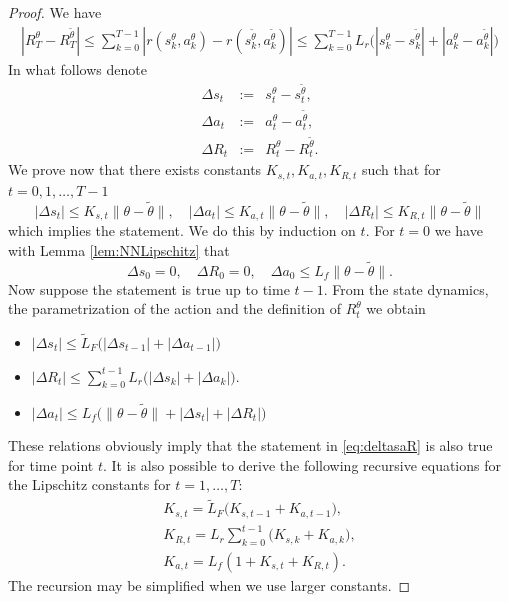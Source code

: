 \documentclass[reqno, 11pt]{amsart}%
\theoremstyle{definition}
\begin{document}
\begin{proof}    
We have
\begin{eqnarray*}
| R_T^\theta - R_T^{\tilde\theta}| \le \sum_{k=0}^{T-1} | r(s_k^\theta,a_k^\theta) - r(s_k^{\tilde\theta},a_k^{\tilde\theta})| \le \sum_{k=0}^{T-1} L_{r} \big( | s_k^\theta- s_k^{\tilde\theta}| +|a_k^\theta -a_k^{\tilde\theta}| \big)
\end{eqnarray*}
In what follows denote
\begin{eqnarray*}
\Delta s_t &:=& s_t^\theta- s_t^{\tilde\theta},\\
\Delta a_t &:=& a_t^\theta- a_t^{\tilde\theta},\\
\Delta R_t &:=& R_t^\theta- R_t^{\tilde\theta}.
\end{eqnarray*}
We prove now that there exists constants $K_{s,t}, K_{a,t}, K_{R,t}$ such that for $t=0,1,\ldots ,T-1$
\begin{equation}\label{eq:deltasaR} | \Delta s_t| \le K_{s,t} \|\theta-\tilde\theta\|,\quad | \Delta a_t| \le K_{a,t}\|\theta-\tilde\theta\|, \quad | \Delta R_t| \le K_{R,t}\|\theta-\tilde\theta\|
\end{equation}
which implies the statement.
We do this by induction on $t$. For $t=0$ we have with Lemma \ref{lem:NNLipschitz} that
$$ \Delta s_0=0, \quad \Delta R_0 =0, \quad \Delta a_0\le L_{f} \|\theta-\tilde\theta\|. $$
Now suppose the statement is true up to time $t-1$.
From the state dynamics, the parametrization of the action and the definition of $R_t^\theta$ we obtain
\begin{itemize}
\item[(1)] $| \Delta s_t| \le \tilde L_{F} \big( |\Delta s_{t-1}|+  |\Delta a_{t-1}|\big)$
\item[(2)] $| \Delta R_t| \le \sum_{k=0}^{t-1}  L_{r} \big( | \Delta s_k| + | \Delta a_k| \big)$.
\item[(3)] $| \Delta a_t| \le L_{f} \big( \|\theta-\tilde\theta\| + |\Delta s_{t}|+ |\Delta R_{t}|\big)$
\end{itemize}
These relations obviously imply that the statement in \eqref{eq:deltasaR} is also true for time point $t$. It is also possible to derive the following recursive equations for the Lipschitz constants for $t=1,\ldots, T$:
\begin{eqnarray*}
    K_{s,t} = \tilde L_F \big( K_{s,t-1} +K_{a,t-1}\big),\\
    K_{R,t} = L_r \sum_{k=0}^{t-1}\big( K_{s,k} +K_{a,k}\big),\\
    K_{a,t} = L_f  ( 1+ K_{s,t} +K_{R,t}).
\end{eqnarray*}
The recursion may be simplified when we use larger constants. 
\end{proof}
\end{document}

